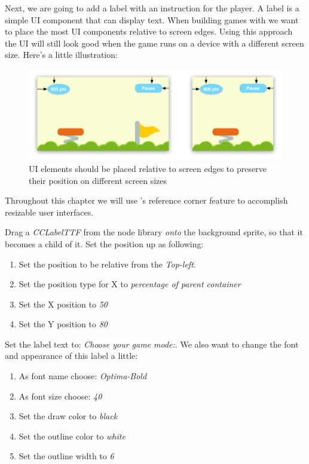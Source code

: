 Next, we are going to add a label with an instruction for the player. A label is
a simple UI component that can display text. When building games with \cocos{}
we want to place the most UI components relative to screen edges. Using this
approach the UI will still look good when the game runs on a device with a
different screen size. Here's a little illustration:

\begin{figure}[H]
		\centering
		\includegraphics[width=0.7\linewidth]{images/Chapter6/multiple_screen_sizes.png}
		\caption{UI elements should be placed relative to screen edges to preserve
		their position on different screen sizes}
\end{figure}

Throughout this chapter we will use \cocos{}'s reference
corner feature to accomplish resizable user interfaces. 

\begin{leftbar}
Drag a \textit{CCLabelTTF} from the node library \textit{onto} the background
sprite, so that it becomes a child of it. Set the position up as following:
\begin{enumerate}
  \item Set the position to be relative from the \textit{Top-left}.
  \item Set the position type for X to \textit{percentage of parent container}
  \item Set the X position to \textit{50}
  \item Set the Y position to \textit{80}
\end{enumerate}

Set the label text to: \textit{Choose your game mode:}. We also want to change
the font and appearance of this label a little:
\begin{enumerate}
  \item As font name choose: \textit{Optima-Bold}
  \item As font size choose: \textit{40}
  \item Set the draw color to \textit{black}
  \item Set the outline color to \textit{white}
  \item Set the outline width to \textit{6}
\end{enumerate}
\end{leftbar}

